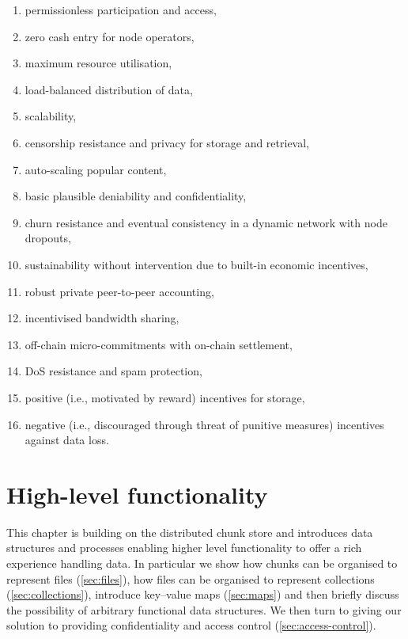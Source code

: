 \begin{enumerate}
    \item permissionless participation and access,
    \item zero cash entry for node operators,
    \item maximum resource utilisation, 
    \item load-balanced distribution of data,
    \item scalability, 
    \item censorship resistance and privacy for storage and retrieval,
    \item auto-scaling popular content,
    \item basic plausible deniability and confidentiality,
    \item churn resistance and eventual consistency in a dynamic network with node dropouts,
    \item sustainability without intervention due to built-in economic incentives,
    \item robust private peer-to-peer accounting, 
    \item incentivised bandwidth sharing,
    \item off-chain micro-commitments with on-chain settlement,
    \item DoS resistance and spam protection,
    \item positive (i.e., motivated by reward) incentives for storage,
    \item negative (i.e., discouraged through threat of punitive measures) incentives against data loss.
\end{enumerate}


\chapter{High-level functionality}\label{sec:high-level-functionality}


This chapter is building on the distributed chunk store and introduces data structures and processes enabling higher level functionality to offer a rich experience handling data. In particular we show how chunks can be organised to represent files (\ref{sec:files}), how files can be organised to represent collections (\ref{sec:collections}), introduce key--value maps (\ref{sec:maps}) and then briefly discuss the possibility of arbitrary functional data structures. We then turn to giving our solution to providing confidentiality and access control (\ref{sec:access-control}). 

